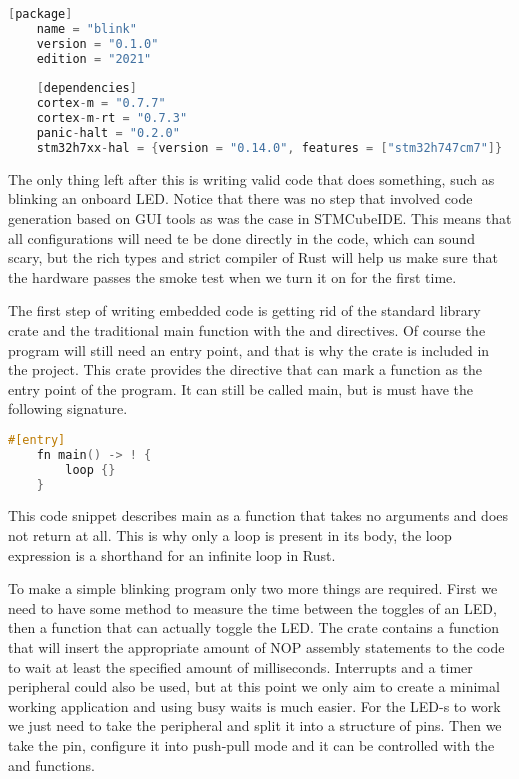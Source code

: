 \begin{lstlisting}[language=C,frame=single,float=!ht]
    [package]
    name = "blink"
    version = "0.1.0"
    edition = "2021"
    
    [dependencies]
    cortex-m = "0.7.7"
    cortex-m-rt = "0.7.3"
    panic-halt = "0.2.0"
    stm32h7xx-hal = {version = "0.14.0", features = ["stm32h747cm7"]}
\end{lstlisting}

The only thing left after this is writing valid code that does something, such as blinking an onboard LED. Notice that there was no step that involved code generation based on GUI tools as was the case in STMCubeIDE. This means that all configurations will need te be done directly in the code, which can sound scary, but the rich types and strict compiler of Rust will help us make sure that the hardware passes the smoke test when we turn it on for the first time.

The first step of writing embedded code is getting rid of the standard library crate and the traditional main function with the \mycode{#![no_std]} and \mycode{#![no_main]} directives. Of course the program will still need an entry point, and that is why the  crate is included in the project. This crate provides the \mycode{#[entry]} directive that can mark a function as the entry point of the program. It can still be called main, but is must have the following signature.

\begin{lstlisting}[language=C,frame=single,float=!ht]
    #[entry]
    fn main() -> ! {
        loop {}
    }
\end{lstlisting}

This code snippet describes main as a function that takes no arguments and does not return at all. This is why only a loop is present in its body, the loop expression is a shorthand for an infinite loop in Rust.

To make a simple blinking program only two more things are required. First we need to have some method to measure the time between the toggles of an LED, then a function that can actually toggle the LED. The  crate contains a  function that will insert the appropriate amount of NOP assembly statements to the code to wait at least the specified amount of milliseconds. Interrupts and a timer peripheral could also be used, but at this point we only aim to create a minimal working application and using busy waits is much easier. For the LED-s to work we just need to take the  peripheral and split it into a structure of pins. Then we take the  pin, configure it into push-pull mode and it can be controlled with the  and  functions.

